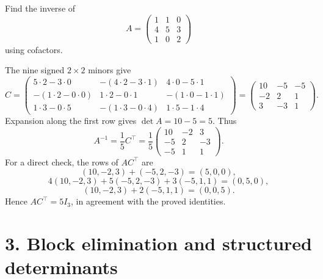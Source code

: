 \begin{example}\label{example:05:adjugate}
Find the inverse of
\[
A=\begin{pmatrix}1&1&0\\4&5&3\\1&0&2\end{pmatrix}
\]
using cofactors.
\par\smallskip
{}
The nine signed \(2\times2\) minors give
\[
C=\begin{pmatrix}
5\cdot2-3\cdot0&-(4\cdot2-3\cdot1)&4\cdot0-5\cdot1\\
-(1\cdot2-0\cdot0)&1\cdot2-0\cdot1&-(1\cdot0-1\cdot1)\\
1\cdot3-0\cdot5&-(1\cdot3-0\cdot4)&1\cdot5-1\cdot4
\end{pmatrix}
=\begin{pmatrix}10&-5&-5\\-2&2&1\\3&-3&1\end{pmatrix}.
\]
Expansion along the first row gives \(\det A=10-5=5\). Thus
\[
A^{-1}=\frac15 C^\top
=\frac15\begin{pmatrix}10&-2&3\\-5&2&-3\\-5&1&1\end{pmatrix}.
\]
For a direct check, the rows of \(AC^\top\) are
\[
(10,-2,3)+(-5,2,-3)=(5,0,0),
\]
\[
4(10,-2,3)+5(-5,2,-3)+3(-5,1,1)=(0,5,0),
\]
\[
(10,-2,3)+2(-5,1,1)=(0,0,5).
\]
Hence \(AC^\top=5I_3\), in agreement with the proved identities.
\end{example}

\section*{3. Block elimination and structured determinants}

